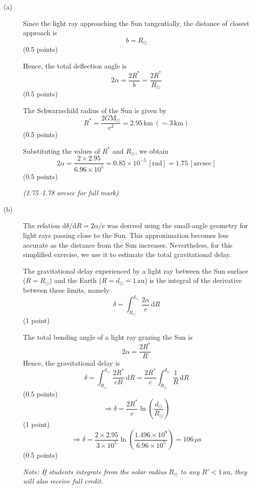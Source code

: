 \begin{description}
\item[(a)] Since the light ray approaching the Sun tangentially, the distance
  of closest approach is
  \[ b = R_\odot \]
  \hfill(0.5 points)

  Hence, the total deflection angle is
  \[ 2\alpha = \frac{2R^*}{b} = \frac{2R^*}{R_\odot} \]
  \hfill(0.5 points)

  The Schwarzschild radius of the Sun is given by
  \[ R^* = \frac{2G\mathrm{M}_\odot}{c^2} = 2.95\,\mathrm{km}\ (\sim 3\,\mathrm{km}) \]
  \hfill(0.5 points)

  Substituting the values of $R^*$ and $R_\odot$, we obtain
  \[ 2\alpha = \frac{2 \times 2.95}{6.96 \times 10^5}
     = 0.85 \times 10^{-5}\,[\mathrm{rad}] = 1.75\,[\mathrm{arcsec}] \]
  \hfill(0.5 points)

  \textit{(1.75--1.78 arcsec for full mark)}

\item[(b)] The relation $\mathrm{d}\delta/\mathrm{d}R = 2\alpha/c$ was
  derived using the small-angle geometry for light rays passing close to the
  Sun. This approximation becomes less accurate as the distance from the Sun
  increases. Nevertheless, for this simplified exercise, we use it to estimate
  the total gravitational delay.

  The gravitational delay experienced by a light ray between the Sun surface
  ($R = R_\odot$) and the Earth ($R = d_\odot = 1\,\mathrm{au}$) is the
  integral of the derivative between these limits, namely
  \[ \delta = \int_{R_\odot}^{d_\odot} \frac{2\alpha}{c}\,\mathrm{d}R \]
  \hfill(1 point)

  The total bending angle of a light ray grazing the Sun is
  \[ 2\alpha = \frac{2R^*}{R} \]
  Hence, the gravitational delay is
  \[ \delta = \int_{R_\odot}^{d_\odot} \frac{2R^*}{cR}\,\mathrm{d}R
     = \frac{2R^*}{c}\int_{R_\odot}^{d_\odot} \frac{1}{R}\,\mathrm{d}R \]
  \hfill(0.5 points)
  \[ \Rightarrow \delta = \frac{2R^*}{c}\ln\left(\frac{d_\odot}{R_\odot}\right) \]
  \hfill(1 point)
  \[ \Rightarrow \delta = \frac{2 \times 2.95}{3 \times 10^5}
     \ln\left(\frac{1.496 \times 10^8}{6.96 \times 10^5}\right)
     = 106\,\mu\mathrm{s} \]
  \hfill(0.5 points)

  \textit{Note: If students integrate from the solar radius $R_\odot$ to any
  $R' < 1\,\mathrm{au}$, they will also receive full credit.}
\end{description}
